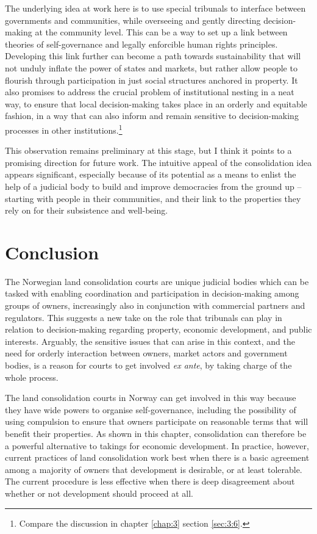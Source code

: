 The underlying idea at work here is to use special tribunals to interface between governments and communities, while overseeing and gently directing decision-making at the community level. This can be a way to set up a link between theories of self-governance and legally enforcible human rights principles. Developing this link further can become a path towards sustainability that will not unduly inflate the power of states and markets, but rather allow people to flourish through participation in just social structures anchored in property. It also promises to address the crucial problem of institutional nesting in a neat way, to ensure that local decision-making takes place in an orderly and equitable fashion, in a way that can also inform and remain sensitive to decision-making processes in other institutions.\footnote{Compare the discussion in chapter \ref{chap:3} section \ref{sec:3:6}.}

This observation remains preliminary at this stage, but I think it points to a promising direction for future work. The intuitive appeal of the consolidation idea appears significant, especially because of its potential as a means to enlist the help of a judicial body to build and improve democracies from the ground up -- starting with people in their communities, and their link to the properties they rely on for their subsistence and well-being.

\section{Conclusion}\label{sec:6:6}

The Norwegian land consolidation courts are unique judicial bodies which can be tasked with enabling coordination and participation in decision-making among groups of owners, increasingly also in conjunction with commercial partners and regulators. This suggests a new take on the role that tribunals can play in relation to decision-making regarding property, economic development, and public interests. Arguably, the sensitive issues that can arise in this context, and the need for orderly interaction between owners, market actors and government bodies, is a reason for courts to get involved {\it ex ante}, by taking charge of the whole process.

The land consolidation courts in Norway can get involved in this way because they have wide powers to organise self-governance, including the possibility of using compulsion to ensure that owners participate on reasonable terms that will benefit their properties. As shown in this chapter, consolidation can therefore be a powerful alternative to takings for economic development. In practice, however, current practices of land consolidation work best when there is a basic agreement among a majority of owners that development is desirable, or at least tolerable. The current procedure is less effective when there is deep disagreement about whether or not development should proceed at all.

